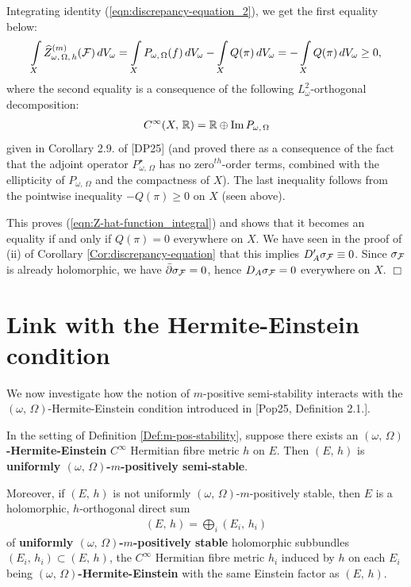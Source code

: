 \documentclass[12pt]{article}
\begin{document}
 Integrating identity (\ref{eqn:discrepancy-equation_2}), we get the first equality below: \begin{eqnarray*}\int\limits_X \widehat{Z}_{\omega,\,\Omega,\,h}^{(m)}({\cal F})\,dV_\omega = \int\limits_X  P_{\omega,\,\Omega}(f)\,dV_\omega - \int\limits_X  Q(\pi)\,dV_\omega = - \int\limits_X  Q(\pi)\,dV_\omega\geq 0,\end{eqnarray*} where the second equality is a consequence of the following $L^2_\omega$-orthogonal decomposition: \begin{eqnarray*}C^\infty(X,\,\mathbb{R}) = \mathbb{R}\oplus\mbox{Im}\,P_{\omega,\,\Omega}\end{eqnarray*} given in Corollary 2.9. of [DP25] (and proved there as a consequence of the fact that the adjoint operator $P_{\omega,\,\Omega}^\star$ has no zero$^{th}$-order terms, combined with the ellipticity of $P_{\omega,\,\Omega}$ and the compactness of $X$). The last inequality follows from the pointwise inequality $-Q(\pi)\geq 0$ on $X$ (seen above).

This proves (\ref{eqn:Z-hat-function_integral}) and shows that it becomes an equality if and only if $Q(\pi) = 0$ everywhere on $X$. We have seen in the proof of (ii) of Corollary \ref{Cor:discrepancy-equation} that this implies $D'_A\sigma_{\cal F}\equiv 0$. Since $\sigma_{\cal F}$ is already holomorphic, we have $\bar\partial\sigma_{\cal F} =0$, hence $D_A\sigma_{\cal F} = 0$ everywhere on $X$.  \hfill $\Box$ 
  

\section{Link with the Hermite-Einstein condition}\label{section:H-E_link}

We now investigate how the notion of $m$-positive semi-stability interacts with the $(\omega,\,\Omega)$-Hermite-Einstein condition introduced in [Pop25, Definition 2.1.].

\begin{The}\label{The:H-E_implies_m-pos-stability} In the setting of Definition \ref{Def:m-pos-stability}, suppose there exists an {\bf $(\omega,\,\Omega)$-Hermite-Einstein} $C^\infty$ Hermitian fibre metric $h$ on $E$. Then $(E,\,h)$ is {\bf uniformly $(\omega,\,\Omega)$-$m$-positively semi-stable}.

  Moreover, if $(E,\,h)$ is not uniformly $(\omega,\,\Omega)$-$m$-positively stable, then $E$ is a holomorphic, $h$-orthogonal direct sum \begin{eqnarray*}(E,\,h) = \bigoplus\limits_i (E_i,\,h_i)\end{eqnarray*} of {\bf uniformly $(\omega,\,\Omega)$-$m$-positively stable} holomorphic subbundles $(E_i,\,h_i)\subset (E,\,h)$, the $C^\infty$ Hermitian fibre metric $h_i$ induced by $h$ on each $E_i$ being {\bf $(\omega,\,\Omega)$-Hermite-Einstein} with the same Einstein factor as $(E,\,h)$.


\end{The}
  
\end{document}
